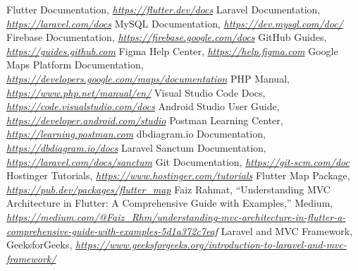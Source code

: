 \documentclass[12pt]{report}
\begin{document}
\vspace{1cm}

\newpage
{}

\begin{thebibliography}{18}
	 Flutter Documentation, \textit{\url{https://flutter.dev/docs}}
	 Laravel Documentation, \textit{\url{https://laravel.com/docs}}
	 MySQL Documentation, \textit{\url{https://dev.mysql.com/doc/}}
	 Firebase Documentation, \textit{\url{https://firebase.google.com/docs}}
	 GitHub Guides, \textit{\url{https://guides.github.com}}
	 Figma Help Center, \textit{\url{https://help.figma.com}}
	 Google Maps Platform Documentation, \textit{\url{https://developers.google.com/maps/documentation}}
	 PHP Manual, \textit{\url{https://www.php.net/manual/en/}}
	 Visual Studio Code Docs, \textit{\url{https://code.visualstudio.com/docs}}
	 Android Studio User Guide, \textit{\url{https://developer.android.com/studio}}
	 Postman Learning Center, \textit{\url{https://learning.postman.com}}
	 dbdiagram.io Documentation, \textit{\url{https://dbdiagram.io/docs}}
	 Laravel Sanctum Documentation, \textit{\url{https://laravel.com/docs/sanctum}}
	 Git Documentation, \textit{\url{https://git-scm.com/doc}}
	 Hostinger Tutorials, \textit{\url{https://www.hostinger.com/tutorials}}
	 Flutter Map Package, \textit{\url{https://pub.dev/packages/flutter_map}}
	 Faiz Rahmat, “Understanding MVC Architecture in Flutter: A Comprehensive Guide with Examples,” Medium, \textit{\url{https://medium.com/@Faiz_Rhm/understanding-mvc-architecture-in-flutter-a-comprehensive-guide-with-examples-5d1a372c7eaf}}
	 Laravel and MVC Framework, GeeksforGeeks, \textit{\url{https://www.geeksforgeeks.org/introduction-to-laravel-and-mvc-framework/}}
\end{thebibliography}
\end{document}
